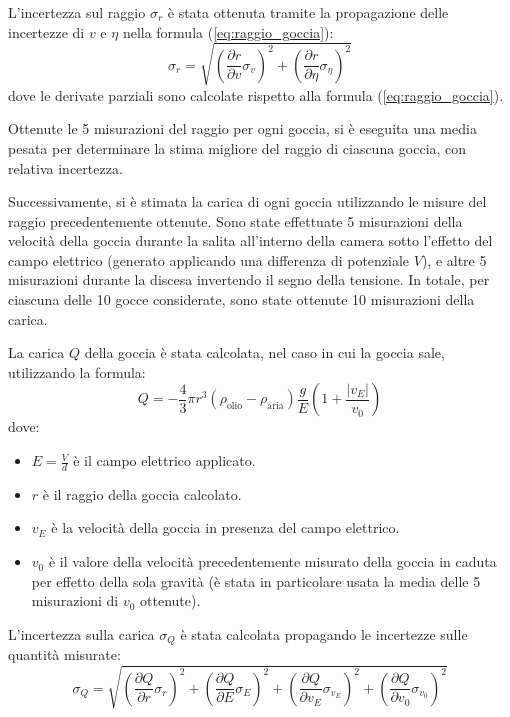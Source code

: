 \documentclass[a4paper,12pt]{article}
\begin{document}
L'incertezza sul raggio \( \sigma_r \) è stata ottenuta tramite la propagazione delle incertezze di \( v \) e \( \eta \) nella formula (\ref{eq:raggio_goccia}):
\begin{equation}
\sigma_r = \sqrt{\left( \frac{\partial r}{\partial v} \sigma_v \right)^2 + \left( \frac{\partial r}{\partial \eta} \sigma_{\eta} \right)^2}
\label{eq:incertezza_raggio}
\end{equation}
dove le derivate parziali sono calcolate rispetto alla formula (\ref{eq:raggio_goccia}).

Ottenute le 5 misurazioni del raggio per ogni goccia, si è eseguita una media pesata per determinare la stima migliore del raggio di ciascuna goccia, con relativa incertezza.

Successivamente, si è stimata la carica di ogni goccia utilizzando le misure del raggio precedentemente ottenute. Sono state effettuate 5 misurazioni della velocità della goccia durante la salita all'interno della camera sotto l'effetto del campo elettrico (generato applicando una differenza di potenziale \( V \)), e altre 5 misurazioni durante la discesa invertendo il segno della tensione. In totale, per ciascuna delle 10 gocce considerate, sono state ottenute 10 misurazioni della carica.

La carica \( Q \) della goccia è stata calcolata, nel caso in cui la goccia sale, utilizzando la formula:
\begin{equation}
Q= -\frac{4}{3} \pi r^3 (\rho_{\text{olio}} - \rho_{\text{aria}}) \frac{g}{E} \left(1 + \frac{|v_E|}{v_0}\right)
\label{eq:carica_goccia_sale}
\end{equation}
dove:
\begin{itemize}
\item \( E = \frac{V}{d} \) è il campo elettrico applicato.
\item \( r \) è il raggio della goccia calcolato.
\item \( v_E \) è la velocità della goccia in presenza del campo elettrico.
\item \( v_0 \) è il valore della velocità precedentemente misurato della goccia in caduta per effetto della sola gravità (è stata in particolare usata la media delle 5 misurazioni di $v_0$ ottenute). 
\end{itemize}

L'incertezza sulla carica \( \sigma_Q \) è stata calcolata propagando le incertezze sulle quantità misurate:
\begin{equation}
\sigma_Q = \sqrt{\left( \frac{\partial Q}{\partial r} \sigma_r \right)^2 + \left( \frac{\partial Q}{\partial E} \sigma_E \right)^2 + \left( \frac{\partial Q}{\partial v_E} \sigma_{v_E} \right)^2 + \left( \frac{\partial Q}{\partial v_0} \sigma_{v_0} \right)^2}
\label{eq:incertezza_carica}
\end{equation}
\end{document}
